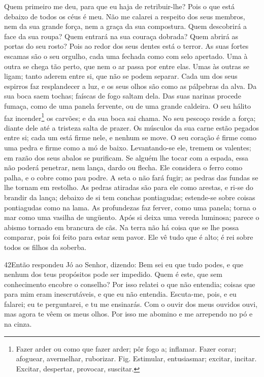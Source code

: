 Quem primeiro me deu, para que eu haja de retribuir-lhe? Pois o
que está debaixo de todos os céus é meu. Não me calarei a
respeito dos seus membros, nem da sua grande força, nem a graça da
sua compostura. Quem descobrirá a face da sua roupa? Quem
entrará na sua couraça dobrada? Quem abrirá as portas do seu
rosto? Pois ao redor dos seus dentes está o terror. As suas
fortes escamas são o seu orgulho, cada uma fechada como com selo
apertado. Uma à outra se chega tão perto, que nem o ar passa
por entre elas. Umas às outras se ligam; tanto aderem entre
si, que não se podem separar. Cada um dos seus espirros faz
resplandecer a luz, e os seus olhos são como as pálpebras da alva.
Da sua boca saem tochas; faíscas de fogo saltam dela.
Das suas narinas procede fumaça, como de uma panela fervente,
ou de uma grande caldeira. O seu hálito faz
incender\footnote{Fazer arder ou como que fazer arder; pôr fogo a;
inflamar. Fazer corar; afoguear, avermelhar, ruborizar. Fig.
Estimular, entusiasmar; excitar, incitar. Excitar, despertar,
provocar, suscitar.} os carvões; e da sua boca sai chama. No
seu pescoço reside a força; diante dele até a tristeza salta de
prazer. Os músculos da sua carne estão pegados entre si; cada
um está firme nele, e nenhum se move. O seu coração é firme
como uma pedra e firme como a mó de baixo. Levantando-se ele,
tremem os valentes; em razão dos seus abalos se purificam. Se
alguém lhe tocar com a espada, essa não poderá penetrar, nem lança,
dardo ou flecha. Ele considera o ferro como palha, e o cobre
como pau podre. A seta o não fará fugir; as pedras das fundas
se lhe tornam em restolho. As pedras atiradas são para ele
como arestas, e ri-se do brandir da lança; debaixo de si tem
conchas pontiagudas; estende-se sobre coisas pontiagudas como na
lama. As profundezas faz ferver, como uma panela; torna o mar
como uma vasilha de ungüento. Após si deixa uma vereda
luminosa; parece o abismo tornado em brancura de cãs. Na
terra não há coisa que se lhe possa comparar, pois foi feito para
estar sem pavor. Ele vê tudo que é alto; é rei sobre todos os
filhos da soberba.

\medskip

\lettrine{42} Então respondeu Jó ao Senhor, dizendo: Bem
sei eu que tudo podes, e que nenhum dos teus propósitos pode ser
impedido. Quem é este, que sem conhecimento encobre o conselho?
Por isso relatei o que não entendia; coisas que para mim eram
inescrutáveis, e que eu não entendia. Escuta-me, pois, e eu
falarei; eu te perguntarei, e tu me ensinarás. Com o ouvir dos
meus ouvidos ouvi, mas agora te vêem os meus olhos. Por isso me
abomino e me arrependo no pó e na cinza.

